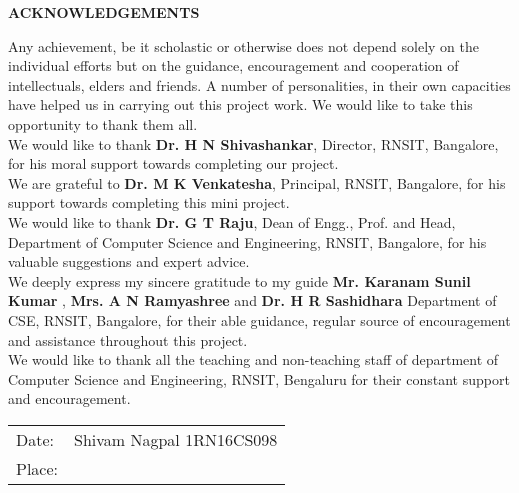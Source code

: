 \thispagestyle{empty}
\begin{center}
\textup{\large{\textbf{ACKNOWLEDGEMENTS}}} \\[0.1in]
\end{center}
\justify
\indent
Any achievement, be it scholastic or otherwise does not depend solely on the individual efforts but on the guidance, encouragement and cooperation of intellectuals, elders and friends. A number of personalities, in their own capacities have helped us in carrying out this project work. We would like to take this opportunity to thank them all.\\

We would like to thank \textbf{Dr. H N Shivashankar}, Director, RNSIT, Bangalore, for his moral support towards completing our project.\\

We are grateful to \textbf{Dr. M K Venkatesha}, Principal, RNSIT, Bangalore, for his support towards completing this mini project.\\

We would like to thank \textbf{Dr. G T Raju}, Dean of Engg., Prof. and Head, Department of Computer Science and Engineering, RNSIT, Bangalore, for his valuable suggestions and expert advice.\\

We deeply express my sincere gratitude to my guide \textbf{Mr. Karanam Sunil Kumar} , \textbf{Mrs. A N Ramyashree} and \textbf{Dr. H R Sashidhara} Department of CSE, RNSIT, Bangalore, for their able guidance, regular source of encouragement and assistance throughout this project.\\

We would like to thank all the teaching and non-teaching staff of department of Computer Science and Engineering, RNSIT, Bengaluru for their constant support and encouragement.\\[2in]
\justify
\begin{tabular}{l r}
\textup{Date:} & \hspace{9cm}\textup{Shivam Nagpal 1RN16CS098}\\
\textup{Place:}
\end{tabular}


\pagebreak
